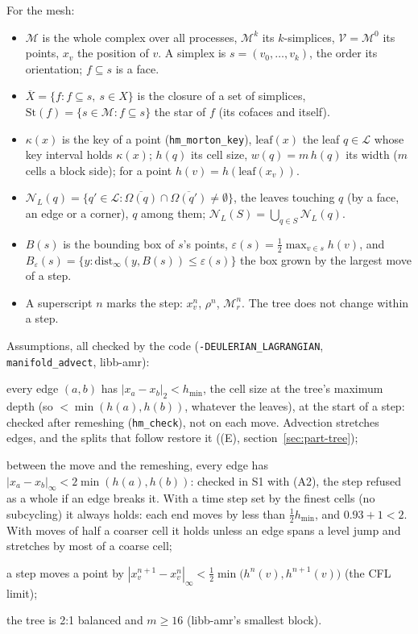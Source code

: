 \documentclass[10pt,a4paper]{article}
\theoremstyle{definition}
\newcommand{\fn}[1]{\texttt{#1}}
\begin{document}
For the mesh:
\begin{itemize}
  \item $\mathcal{M}$ is the whole complex over all processes, $\mathcal{M}^k$
    its $k$-simplices, $\mathcal{V} = \mathcal{M}^0$ its points, $x_v$ the
    position of $v$. A simplex is $s = (v_0, \ldots, v_k)$, the order its
    orientation; $f \subseteq s$ is a face.
  \item $\overline{X} = \{ f : f \subseteq s,\ s \in X \}$ is the closure of
    a set of simplices, $\mathrm{St}(f) = \{ s \in \mathcal{M} : f
    \subseteq s \}$ the star of $f$ (its cofaces and itself).
  \item $\kappa(x)$ is the key of a point (\fn{hm\_morton\_key}),
    $\mathrm{leaf}(x)$ the leaf $q \in \mathcal{L}$ whose key interval holds
    $\kappa(x)$; $h(q)$ its cell size, $w(q) = m\,h(q)$ its width ($m$ cells
    a block side); for a point $h(v) = h(\mathrm{leaf}(x_v))$.
  \item $\mathcal{N}_L(q) = \{ q' \in \mathcal{L} : \overline{\Omega(q)}
    \cap \overline{\Omega(q')} \ne \emptyset \}$, the leaves touching $q$
    (by a face, an edge or a corner), $q$ among them;
    $\mathcal{N}_L(S) = \bigcup_{q \in S} \mathcal{N}_L(q)$.
  \item $B(s)$ is the bounding box of $s$'s points, $\varepsilon(s) =
    \tfrac12 \max_{v \in s} h(v)$, and $B_\varepsilon(s) = \{ y :
    \mathrm{dist}_\infty(y, B(s)) \le \varepsilon(s) \}$ the box grown by
    the largest move of a step.
  \item A superscript $n$ marks the step: $x^n_v$, $\rho^n$,
    $\mathcal{M}^n_r$. The tree does not change within a step.
\end{itemize}

Assumptions, all checked by the code (\fn{-DEULERIAN\_LAGRANGIAN},
\fn{manifold\_advect}, libb-amr):
\begin{description}[leftmargin=2.6em, style=nextline]
  \item[(A1)] every edge $(a, b)$ has $|x_a - x_b|_2 < h_{\min}$, the cell
    size at the tree's maximum depth (so $< \min(h(a), h(b))$, whatever
    the leaves), at the start of a step: checked after remeshing
    (\fn{hm\_check}), not on each move. Advection stretches edges, and the
    splits that follow restore it ((E), section~\ref{sec:part-tree});
  \item[(A1$'$)] between the move and the remeshing, every edge has $|x_a
    - x_b|_\infty < 2 \min(h(a), h(b))$: checked in S1 with (A2), the
    step refused as a whole if an edge breaks it. With a time step set by
    the finest cells (no subcycling) it always holds: each end moves by
    less than $\tfrac12 h_{\min}$, and $0.93 + 1 < 2$. With moves of half
    a coarser cell it holds unless an edge spans a level jump and
    stretches by most of a coarse cell;
  \item[(A2)] a step moves a point by $|x^{n+1}_v - x^n_v|_\infty <
    \tfrac12 \min\big(h^n(v), h^{n+1}(v)\big)$ (the CFL limit);
  \item[(A3)] the tree is 2:1 balanced and $m \ge 16$ (libb-amr's
    smallest block).
\end{description}
\end{document}
